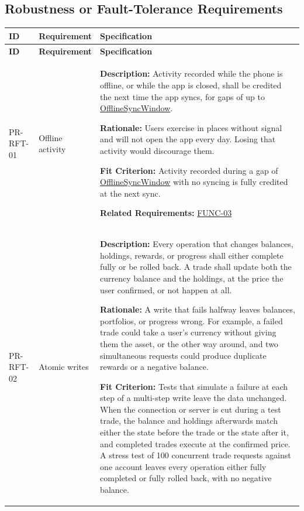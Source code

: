 \documentclass[12pt]{article}
\newcommand{\const}[1]{\hyperlink{const:#1}{\textsf{#1}}}
\begin{document}
\subsection{Robustness or Fault-Tolerance Requirements}

\small
\setlength{\tabcolsep}{4pt}
\begin{xltabular}{\textwidth}{|p{2.6cm}|p{3.4cm}|X|}
\hline
\textbf{ID} & \textbf{Requirement} & \textbf{Specification} \\
\hline
\endfirsthead
\hline
\textbf{ID} & \textbf{Requirement} & \textbf{Specification} \\
\hline
\endhead

PR-RFT-01\hypertarget{req:PR-RFT-01}{} &
Offline activity &
\textbf{Description:} Activity recorded while the phone is offline, or while the app is closed, shall be credited the next time the app syncs, for gaps of up to \const{OfflineSyncWindow}.

\textbf{Rationale:} Users exercise in places without signal and will not open the app every day. Losing that activity would discourage them.

\textbf{Fit Criterion:} Activity recorded during a gap of \const{OfflineSyncWindow} with no syncing is fully credited at the next sync.

\textbf{Related Requirements:} \hyperlink{req:FUNC-03}{FUNC-03}\\
\hline

PR-RFT-02\hypertarget{req:PR-RFT-02}{} &
Atomic writes &
\textbf{Description:} Every operation that changes balances, holdings, rewards, or progress shall either complete fully or be rolled back. A trade shall update both the currency balance and the holdings, at the price the user confirmed, or not happen at all.

\textbf{Rationale:} A write that fails halfway leaves balances, portfolios, or progress wrong. For example, a failed trade could take a user's currency without giving them the asset, or the other way around, and two simultaneous requests could produce duplicate rewards or a negative balance.

\textbf{Fit Criterion:} Tests that simulate a failure at each step of a multi-step write leave the data unchanged. When the connection or server is cut during a test trade, the balance and holdings afterwards match either the state before the trade or the state after it, and completed trades execute at the confirmed price. A stress test of 100 concurrent trade requests against one account leaves every operation either fully completed or fully rolled back, with no negative balance.


\end{xltabular}
\end{document}
